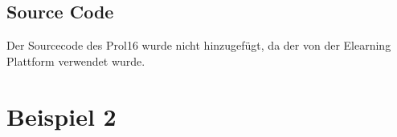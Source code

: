 \documentclass[12pt,a4paper]{article}
\begin{document}


\subsection{Source Code}

Der Sourcecode des Prol16 wurde nicht hinzugefügt, da der von der Elearning Plattform verwendet wurde.







%





\section{Beispiel 2}
\end{document}

